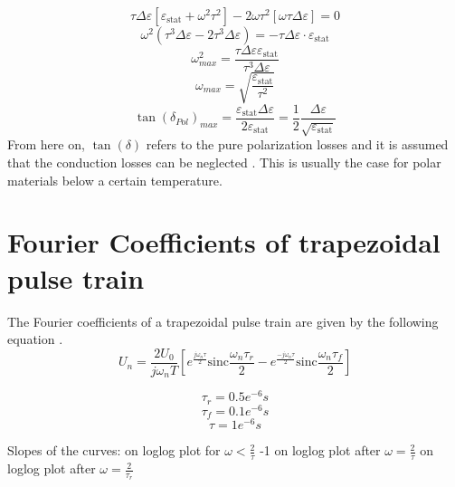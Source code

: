 \begin{equation}
\tau \Delta \varepsilon [\varepsilon_{\textrm{stat}} + \omega^2 \tau^2] -2\omega \tau^2 [\omega \tau \Delta \varepsilon] = 0
\end{equation}
\begin{equation}
\omega^2 (\tau^3 \Delta \varepsilon -2 \tau^3 \Delta \varepsilon) = - \tau \Delta \varepsilon \cdot \varepsilon_{\textrm{stat}}
\end{equation}
\begin{equation}
\omega_{max}^2 = \frac{\tau \Delta \varepsilon \varepsilon_{\textrm{stat}}}{\tau^3 \Delta \varepsilon}
\end{equation}
\begin{equation}
\omega_{max} = \sqrt{\frac{\varepsilon_{\textrm{stat}}}{\tau^2}}
\end{equation}
\begin{equation}
\tan(\delta_{Pol})_{max} = \frac{\varepsilon_{\textrm{stat}} \Delta\varepsilon}{2\varepsilon_{\textrm{stat}}} = \frac{1}{2} \frac{\Delta \varepsilon}{\sqrt{\varepsilon_{\textrm{stat}}}}
\end{equation}
From here on, $\tan(\delta)$ refers to the pure polarization losses and it is assumed that the conduction losses can be neglected . This is usually the case for polar materials below a certain temperature. 

\section{Fourier Coefficients of trapezoidal pulse  train }

The Fourier coefficients of a trapezoidal pulse train are given by the following equation \cite{}. 
\begin{equation}
 U_n = \frac{2 U_0}{j \omega_n T} [e^{\frac{j \omega_n \tau}{2}} \textrm{sinc}{\frac { \omega_n \tau_r }{2}} -e^{\frac{-j \omega_n \tau}{2}} \textrm{sinc}{\frac{ \omega_n \tau_f}{2}}]
\end{equation}

 
\begin{equation}
 \tau_r = 0.5e^{-6 } s
  \end{equation}
  \begin{equation}
 \tau_f = 0.1e^{-6} s
  \end{equation}
 \begin{equation}
\tau= 1e^{-6} s
 \end{equation}
 
Slopes of the curves:  on loglog plot for $\omega < \frac{2}{\tau}$
-1 on loglog plot after $\omega = \frac{2}{\tau}$  on loglog plot after $\omega = \frac{2}{\tau_r}$



